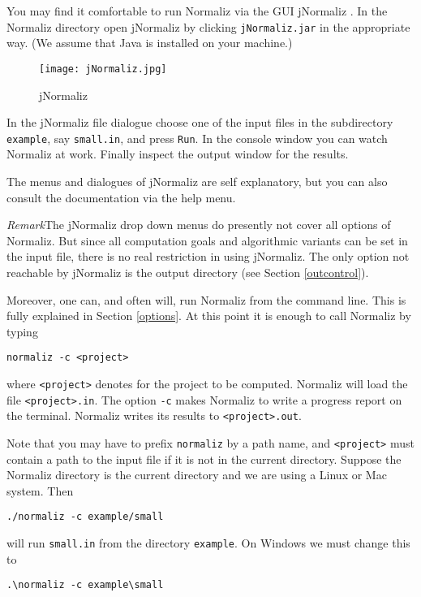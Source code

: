 \documentclass[12pt,a4paper]{scrartcl}
\theoremstyle{definition}
\def\ttt{\texttt}
\begin{document}
You may find it comfortable to run Normaliz via the GUI jNormaliz \cite{AI}. In the Normaliz directory open jNormaliz by clicking
\ttt{jNormaliz.jar} in the appropriate way. (We assume that
Java is installed on your machine.)
\begin{figure}[bht]
	\centering
	\texttt{[image: jNormaliz.jpg]}\\%
	\caption{jNormaliz}\label{new}
\end{figure}
In the jNormaliz file dialogue choose one of the input files
in the subdirectory \ttt{example}, say \ttt{small.in}, and
press \ttt{Run}. In the console window you can watch Normaliz
at work. Finally inspect the output window for the results.

The menus and dialogues of jNormaliz are self explanatory, but you
can also consult the documentation \cite{AI} via the help menu.

\emph{Remark}\enspace The jNormaliz drop down menus do presently not cover all options of Normaliz. But since all computation goals and algorithmic variants can be set in the input file, there is no real restriction in using jNormaliz. The only option not reachable by jNormaliz is the output directory (see Section \ref{outcontrol}).

Moreover, one can, and often will, run Normaliz from the
command line. This is fully explained in Section \ref{options}. At this point it is enough to call Normaliz by typing
\begin{Verbatim}
normaliz -c <project>
\end{Verbatim}
where \ttt{<project>} denotes for the project to be computed. Normaliz will load the file \ttt{<project>.in}. The option \verb|-c| makes Normaliz to write a progress report on the terminal. Normaliz writes its results to \verb|<project>.out|.

Note that you may have to prefix  \ttt{normaliz} by a path name, and \ttt{<project>} must contain a path to the input file if it is not in the current directory. Suppose the Normaliz directory is the current directory and we are using a Linux or Mac system. Then
\begin{Verbatim}
./normaliz -c example/small
\end{Verbatim}
will run \ttt{small.in} from the directory \ttt{example}. On Windows we must change this to
\begin{Verbatim}
.\normaliz -c example\small
\end{Verbatim}
\end{document}
